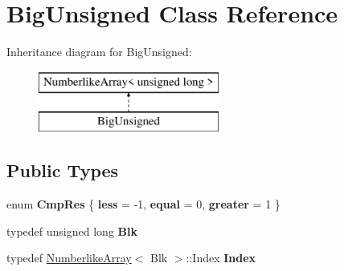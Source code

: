 \hypertarget{class_big_unsigned}{}\section{Big\+Unsigned Class Reference}
\label{class_big_unsigned}
Inheritance diagram for Big\+Unsigned\+:\begin{figure}[H]
\begin{center}
\leavevmode
\includegraphics[height=2.000000cm]{class_big_unsigned}
\end{center}
\end{figure}
\subsection*{Public Types}
\begin{DoxyCompactItemize}
\item 
\mbox{\label{class_big_unsigned_a1e3ef66473b8bccb9af0b555be7a0710}} 
enum {\bfseries Cmp\+Res} \{ {\bfseries less} = -\/1, 
{\bfseries equal} = 0, 
{\bfseries greater} = 1
 \}
\item 
\mbox{\label{class_big_unsigned_a100302c62ee708432c81de0a961c319b}} 
typedef unsigned long {\bfseries Blk}
\item 
\mbox{\label{class_big_unsigned_aed8ad0984c6a9286a04cff3431e34509}} 
typedef \mbox{\hyperlink{class_numberlike_array}{Numberlike\+Array}}$<$ Blk $>$\+::Index {\bfseries Index}
\end{DoxyCompactItemize}
